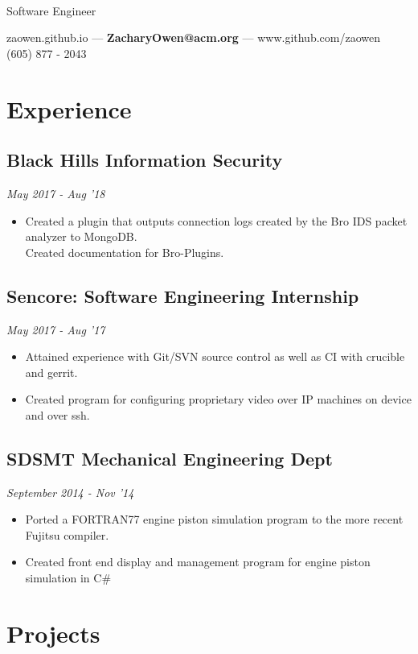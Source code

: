 \documentclass[11pt]{article}
\author{Zachary Owen}
\makeatletter
\renewcommand{\maketitle}{
   \begin{center}
   {\huge \bfseries
   \theauthor\\}
   {\color{red} Software Engineer}

zaowen.github.io ---
{\bfseries ZacharyOwen@acm.org} --- 
www.github.com/zaowen  
\\
(605) 877 - 2043 
\end{center}
}
\makeatother
\begin{document}
\maketitle

\section{E{\color{gray}xperience}}

\subsection{Black Hills Information Security \hfill}
{\it May 2017 - Aug '18}
\begin{itemize}
\setlength\itemsep{-.5em}
\item Created a plugin that outputs connection logs created by the Bro IDS packet analyzer to MongoDB. 
\\Created documentation for Bro-Plugins.
\end{itemize}

\subsection{Sencore: Software Engineering Internship \hfill}
{\it May 2017 - Aug '17}
\begin{itemize}
\setlength\itemsep{-.5em}
\item Attained experience with Git/SVN source control as well as CI with crucible and gerrit.
\item Created program for configuring proprietary video over IP machines on device and over ssh.
\end{itemize}

\subsection{SDSMT Mechanical Engineering Dept \hfill}
{\it September 2014 - Nov '14}
\begin{itemize}
\setlength\itemsep{-.5em}
\item Ported a FORTRAN77 engine piston simulation program to the more recent Fujitsu compiler. 
\item Created front end display and management program for engine piston simulation in C\#
\end{itemize}

\section{P{\color{gray}rojects}}
\end{document}
